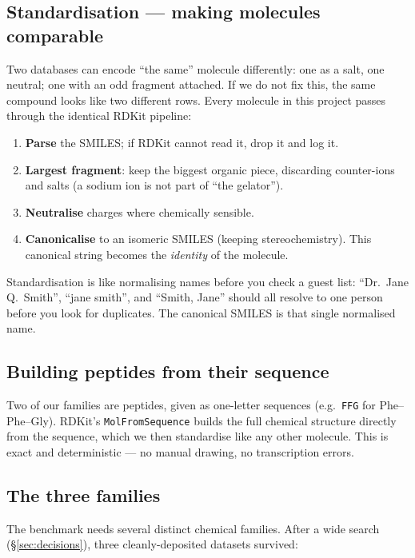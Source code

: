 \documentclass[11pt]{article}
\newenvironment{callout}[2][blue]{%
  \par\smallskip\colorlet{shadecolor}{#1!7}%
  \begin{shaded}\noindent{\color{#1!55!black}\bfseries #2.\ }\ignorespaces}%
  {\end{shaded}\smallskip}
\newcommand{\code}[1]{\texttt{#1}}
\begin{document}
\subsection{Standardisation --- making molecules comparable}
Two databases can encode ``the same'' molecule differently: one as a salt, one
neutral; one with an odd fragment attached. If we do not fix this, the same
compound looks like two different rows. Every molecule in this project passes
through the identical RDKit pipeline:
\begin{enumerate}[leftmargin=1.6em]
  \item \textbf{Parse} the SMILES; if RDKit cannot read it, drop it and log it.
  \item \textbf{Largest fragment}: keep the biggest organic piece, discarding
    counter-ions and salts (a sodium ion is not part of ``the gelator'').
  \item \textbf{Neutralise} charges where chemically sensible.
  \item \textbf{Canonicalise} to an isomeric SMILES (keeping stereochemistry).
    This canonical string becomes the \emph{identity} of the molecule.
\end{enumerate}

\begin{callout}[teal]{Intuition}
Standardisation is like normalising names before you check a guest list: ``Dr.\
Jane Q.\ Smith'', ``jane smith'', and ``Smith, Jane'' should all resolve to one
person before you look for duplicates. The canonical SMILES is that single
normalised name.
\end{callout}

\subsection{Building peptides from their sequence}
Two of our families are peptides, given as one-letter sequences (e.g.\ \code{FFG}
for Phe--Phe--Gly). RDKit's \code{MolFromSequence} builds the full chemical
structure directly from the sequence, which we then standardise like any other
molecule. This is exact and deterministic --- no manual drawing, no transcription
errors.

\subsection{The three families}
The benchmark needs several distinct chemical families. After a wide search
(\S\ref{sec:decisions}), three cleanly-deposited datasets survived:
\end{document}
